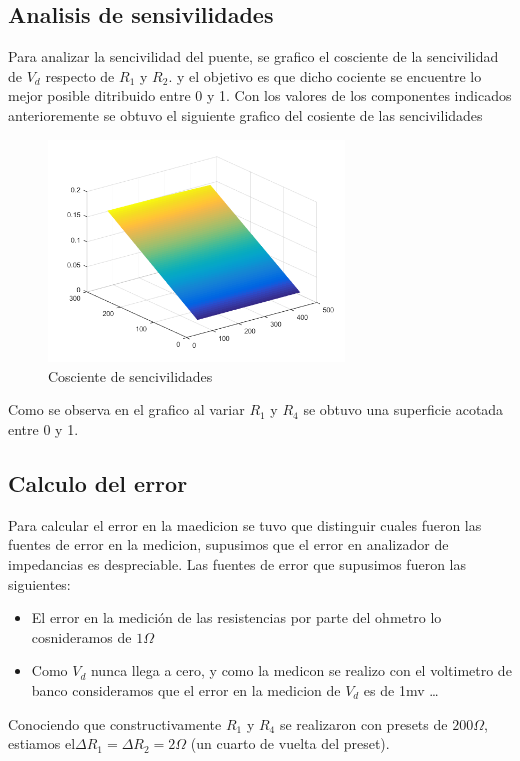 \documentclass[../../main.tex]{subfiles}
\begin{document}
\subsection{Analisis de sensivilidades}
Para analizar la sencivilidad del puente, se grafico el cosciente de la sencivilidad de $V_d$ respecto de $R_1$ y $R_2$. y el objetivo es que dicho cociente se encuentre lo mejor posible ditribuido entre 0 y 1.
Con los valores de los componentes indicados anterioremente se obtuvo el siguiente grafico del cosiente de las sencivilidades
\begin{figure}[H]	
	\centering
	\includegraphics[width=0.7\textwidth]{fotos/sen.png}
	\caption{Cosciente de sencivilidades} 
\end{figure}
Como se observa en el grafico al variar $R_1$ y $R_4$ se obtuvo una superficie acotada entre 0 y 1.

\subsection{Calculo del error}
Para calcular el error en la maedicion se tuvo que distinguir cuales fueron las fuentes de error en la medicion, supusimos que el error en analizador de impedancias es despreciable.
Las fuentes de error que supusimos fueron las siguientes:
\begin{itemize}  
\item El error en la medición de las resistencias por parte del ohmetro lo cosnideramos de $1\Omega$
\item Como $V_d$ nunca llega a cero, y como la medicon se realizo con el voltimetro de banco consideramos que el error en la medicion de $V_d$ es de 1mv \ldots 
\end{itemize}

Conociendo que constructivamente $R_1$ y $R_4$ se realizaron con presets de $200\Omega$, estiamos el$\Delta R_1=\Delta R_2=2\Omega$ (un cuarto de vuelta del preset).
\end{document}
